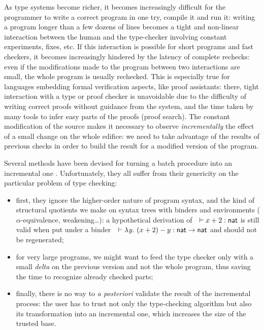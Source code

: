 \documentclass[9pt]{sigplanconf}
\begin{document}
As type systems become richer, it becomes increasingly difficult for
the programmer to write a correct program in one try, compile it and
run it: writing a program longer than a few dozens of lines becomes a
tight and non-linear interaction between the human and the
type-checker involving constant experiments, fixes, etc. If this
interaction is possible for short programs and fast checkers, it
becomes increasingly hindered by the latency of complete rechecks:
even if the modifications made to the program between two interactions
are small, the whole program is usually rechecked. This is especially
true for languages embedding formal verification aspects, like proof
assistants: there, tight interaction with a type or proof checker is
unavoidable due to the difficulty of writing correct proofs without
guidance from the system, and the time taken by many tools to infer
easy parts of the proofs (proof search). The constant modification of
the source makes it necessary to observe \emph{incrementally} the
effect of a small change on the whole edifice: we need to take
advantage of the results of previous checks in order to build the
result for a modified version of the program.

Several methods have been devised for turning a batch procedure into
an incremental one \cite{pugh1989incremental,
  acar2003selective}. Unfortunately, they all suffer from their
genericity on the particular problem of type checking:
\begin{itemize}
\item first, they ignore the higher-order nature of program syntax,
  and the kind of structural quotients we make on syntax trees with
  binders and environments ($\alpha$-equivalence, weakening\ldots): a
  hypothetical derivation of\ \ $\vdash x+2 : \text{\textsf{nat}}$ is still valid
  when put under a binder\ \ $\vdash\lambda{\ensuremath{\text{\textit{y}}}}.\  (x + 2) -
  y:\text{\textsf{nat}}\to\text{\textsf{nat}}$ and should not be regenerated;
\item for very large programs, we might want to feed the type checker
  only with a small \emph{delta} on the previous version and not the
  whole program, thus saving the time to recognize already checked
  parts;
\item finally, there is no way to \emph{a posteriori} validate the
  result of the incremental process: the user has to trust not only
  the type-checking algorithm but also its transformation into an
  incremental one, which increases the size of the trusted base.
\end{itemize}
\end{document}

